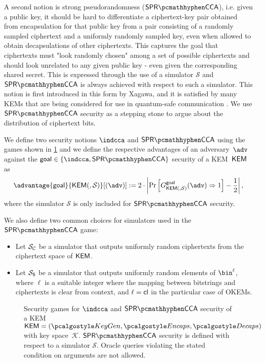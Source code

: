 A second notion is strong pseudorandomness ($\sprcca$), i.e. given a public key, it should be hard to differentiate a ciphertext-key pair obtained from encapsulation for that public key from a pair consisting of a randomly sampled ciphertext and a uniformly randomly sampled key, even when allowed to obtain decapsulations of other ciphertexts.
This captures the goal that ciphertexts must "look randomly chosen" among a set of possible ciphertexts and should look unrelated to any given public key - even given the corresponding shared secret.
This is expressed through the use of a simulator $\mathcal S$ and $\sprcca$ is always achieved with respect to such a simulator.
This notion is first introduced \cite{EC:Xagawa22} in this form by Xagawa, and it is satisfied by many KEMs that are being considered for use in quantum-safe communication \cite{EC:Xagawa22}. We use $\sprcca$ security as a stepping stone to argue about the distribution of ciphertext bits.

\begin{definition} \label{def:kem-security}
    We define two security notions $\indcca$ and $\sprcca$ using the games shown in \cref{fig:kem-security} and we define the respective advantages of an adversary~$\adv$ against the $\mathsf{goal} \in \{\indcca, \sprcca\}$ security of a KEM~$\mathsf{KEM}$ as
    \[
        \advantage{\mathsf{goal}}{\KEM(, \mathcal{S})}[(\adv)] := 2 \cdot \left| \Pr \left[ G^{\mathsf{goal}}_{\KEM(, \mathcal{S})}(\adv) \Rightarrow 1 \right] - \frac{1}{2} \right|,
    \]
    where the simulator $\mathcal{S}$ is only included for $\sprcca$ security.

    We also define two common choices for simulators used in the $\sprcca$ game:
    \begin{itemize}
        \item Let $\mathcal{S}_\mathcal{C}$ be a simulator that outputs uniformly random ciphertexts from the ciphertext space of $\mathsf{KEM}$.
        \item Let $\simulbin$ be a simulator that outputs uniformly random elements of $\bin^\ell$, where $\ell$ is a suitable integer where the mapping between bitstrings and ciphertexts is clear from context, and $\ell = \mathsf{cl}$ in the particular case of OKEMs.
    \end{itemize}
\end{definition}

\begin{figure}
    
    \caption[
        Security games for $\indcca$ and $\sprcca$ security of a KEM or obfuscated KEM.
    ]{
        Security games for $\indcca$ and $\sprcca$ security of a KEM~$\KEM = (\kgen, \encaps, \decaps)$ with key space~$\mathcal K$. $\sprcca$ security is defined with respect to a simulator $\mathcal S$. Oracle queries violating the stated condition on arguments are not allowed.
    }
    \label{fig:kem-security}
\end{figure}

